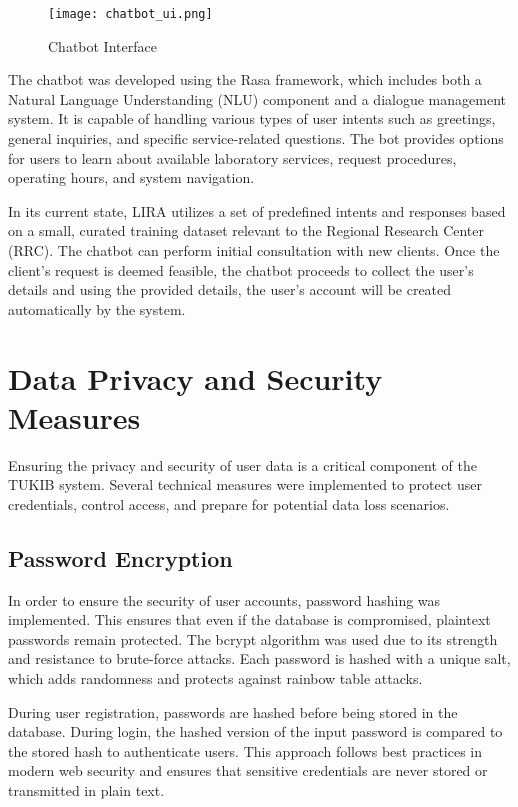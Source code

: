 \newpage

\begin{figure}[h]
	\centering
	\texttt{[image: chatbot\_ui.png]}
	\caption{Chatbot Interface}
	\label{fig:chatbot_ui}
\end{figure}

The chatbot was developed using the Rasa framework, which includes both a Natural Language Understanding (NLU) component and a dialogue management system. It is capable of handling various types of user intents such as greetings, general inquiries, and specific service-related questions. The bot provides options for users to learn about available laboratory services, request procedures, operating hours, and system navigation.

In its current state, LIRA utilizes a set of predefined intents and responses based on a small, curated training dataset relevant to the Regional Research Center (RRC). The chatbot can perform initial consultation with new clients. Once the client's request is deemed feasible, the chatbot proceeds to collect the user’s details and using the provided details, the user's account will be created automatically by the system.

\section{Data Privacy and Security Measures}

Ensuring the privacy and security of user data is a critical component of the TUKIB system. Several technical measures were implemented to protect user credentials, control access, and prepare for potential data loss scenarios.

\subsection{Password Encryption}

In order to ensure the security of user accounts, password hashing was implemented. This ensures that even if the database is compromised, plaintext passwords remain protected. The bcrypt algorithm was used due to its strength and resistance to brute-force attacks. Each password is hashed with a unique salt, which adds randomness and protects against rainbow table attacks.

During user registration, passwords are hashed before being stored in the database. During login, the hashed version of the input password is compared to the stored hash to authenticate users. This approach follows best practices in modern web security and ensures that sensitive credentials are never stored or transmitted in plain text.

